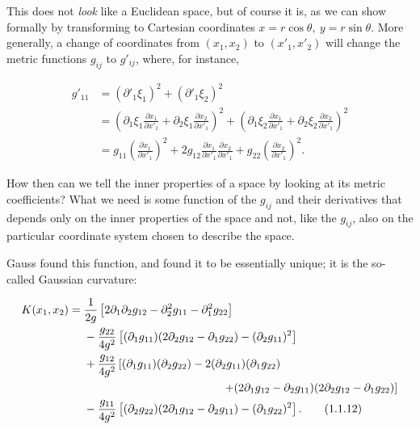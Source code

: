 This does not \emph{look} like a Euclidean space, but of course it is, as we
can show formally by transforming to Cartesian coordinates
\(x=r\cos\theta,\ y=r\sin\theta\). More generally, a change of coordinates
from \((x_1,x_2)\) to \((x'_1,x'_2)\) will change the metric functions
\(g_{ij}\) to \(g'_{ij}\), where, for instance,

\begin{equation}
  \begin{aligned}
  g'_{11}
    &=(\partial'_1\xi_1)^2+(\partial'_1\xi_2)^2\\
    &=\left(\partial_1\xi_1\frac{\partial x_1}{\partial x'_1}
       +\partial_2\xi_1\frac{\partial x_2}{\partial x'_1}\right)^2
     +\left(\partial_1\xi_2\frac{\partial x_1}{\partial x'_1}
       +\partial_2\xi_2\frac{\partial x_2}{\partial x'_1}\right)^2\\
    &=g_{11}\left(\frac{\partial x_1}{\partial x'_1}\right)^2
      +2g_{12}\frac{\partial x_1}{\partial x'_1}
                \frac{\partial x_2}{\partial x'_1}
      +g_{22}\left(\frac{\partial x_2}{\partial x'_1}\right)^2.
  \end{aligned}
  \tag{1.1.11}\label{eq:1.1.11}
\end{equation}

How then can we tell the inner properties of a space by looking at its metric
coefficients? What we need is some function of the \(g_{ij}\) and their
derivatives that depends only on the inner properties of the space and not,
like the \(g_{ij}\), also on the particular coordinate system chosen to
describe the space.

Gauss found this function, and found it to be essentially unique; it is the
so-called Gaussian curvature:

\begin{align}
K(x_1,x_2)={}&
\frac{1}{2g}\left[
  2\partial_1\partial_2g_{12}
  -\partial_2^2g_{11}
  -\partial_1^2g_{22}\right]\notag\\
&-\frac{g_{22}}{4g^2}\left[
  (\partial_1g_{11})(2\partial_2g_{12}-\partial_1g_{22})
  -(\partial_2g_{11})^2\right]\notag\\
&+\frac{g_{12}}{4g^2}\left[
  (\partial_1g_{11})(\partial_2g_{22})
  -2(\partial_2g_{11})(\partial_1g_{22})\right.\notag\\
&\hspace{4.3cm}\left.
  +(2\partial_1g_{12}-\partial_2g_{11})
   (2\partial_2g_{12}-\partial_1g_{22})\right]\notag\\
&-\frac{g_{11}}{4g^2}\left[
  (\partial_2g_{22})(2\partial_1g_{12}-\partial_2g_{11})
  -(\partial_1g_{22})^2\right].
\tag{1.1.12}\label{eq:1.1.12}
\end{align}

